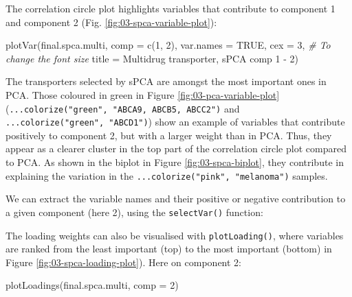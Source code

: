 \documentclass[
]{book}
\newenvironment{Shaded}{\begin{snugshade}}{\end{snugshade}}
\newcommand{\AttributeTok}[1]{\textcolor[rgb]{0.77,0.63,0.00}{#1}}
\newcommand{\CommentTok}[1]{\textcolor[rgb]{0.56,0.35,0.01}{\textit{#1}}}
\newcommand{\ConstantTok}[1]{\textcolor[rgb]{0.00,0.00,0.00}{#1}}
\newcommand{\DecValTok}[1]{\textcolor[rgb]{0.00,0.00,0.81}{#1}}
\newcommand{\FunctionTok}[1]{\textcolor[rgb]{0.00,0.00,0.00}{#1}}
\newcommand{\NormalTok}[1]{#1}
\newcommand{\SpecialCharTok}[1]{\textcolor[rgb]{0.00,0.00,0.00}{#1}}
\newcommand{\StringTok}[1]{\textcolor[rgb]{0.31,0.60,0.02}{#1}}
\begin{document}
The correlation circle plot highlights variables that contribute to component 1 and component 2 (Fig. \ref{fig:03-spca-variable-plot}):

\begin{Shaded}
\begin{Highlighting}[]
\FunctionTok{plotVar}\NormalTok{(final.spca.multi, }\AttributeTok{comp =} \FunctionTok{c}\NormalTok{(}\DecValTok{1}\NormalTok{, }\DecValTok{2}\NormalTok{), }\AttributeTok{var.names =} \ConstantTok{TRUE}\NormalTok{, }
        \AttributeTok{cex =} \DecValTok{3}\NormalTok{, }\CommentTok{\# To change the font size }
        \AttributeTok{title =} \StringTok{\textquotesingle{}Multidrug transporter, sPCA comp 1 {-} 2\textquotesingle{}}\NormalTok{)}
\end{Highlighting}
\end{Shaded}



The transporters selected by sPCA are amongst the most important ones in PCA. Those coloured in green in Figure \ref{fig:03-pca-variable-plot} (\texttt{...colorize("green",\ "ABCA9,\ ABCB5,\ ABCC2")} and \texttt{...colorize("green",\ "ABCD1")}) show an example of variables that contribute positively to component 2, but with a larger weight than in PCA. Thus, they appear as a clearer cluster in the top part of the correlation circle plot compared to PCA. As shown in the biplot in Figure \ref{fig:03-spca-biplot}, they contribute in explaining the variation in the \texttt{...colorize("pink",\ "melanoma")} samples.

We can extract the variable names and their positive or negative contribution to a given component (here 2), using the \texttt{selectVar()} function:

\begin{Shaded}
\end{Shaded}

The loading weights can also be visualised with \texttt{plotLoading()}, where variables are ranked from the least important (top) to the most important (bottom) in Figure \ref{fig:03-spca-loading-plot}). Here on component 2:

\begin{Shaded}
\begin{Highlighting}[]
\FunctionTok{plotLoadings}\NormalTok{(final.spca.multi, }\AttributeTok{comp =} \DecValTok{2}\NormalTok{)}
\end{Highlighting}
\end{Shaded}
\end{document}
